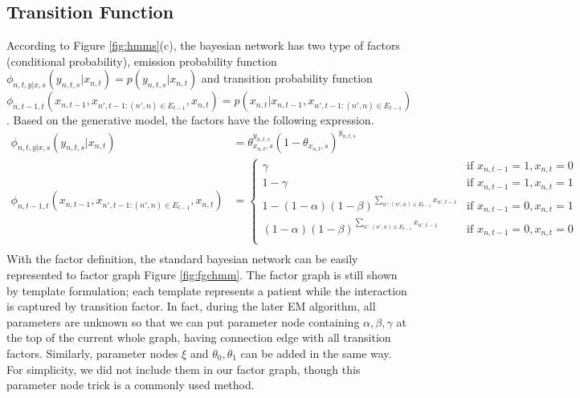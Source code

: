 \documentclass{article} %
\begin{document}
\subsection{Transition Function}
According to Figure \ref{fig:hmms}(c), the bayesian network has two type of factors (conditional probability), emission probability function $\phi_{n,t,y|x,s}(y_{n,t,s}|x_{n,t})=p(y_{n,t,s}|x_{n,t})$ and transition probability function $\phi_{n,t-1,t}(x_{n,t-1},x_{n',t-1:(n',n)\in E_{t-1}},x_{n,t})=p(x_{n,t}|x_{n,t-1},x_{n',t-1:(n',n)\in E_{t-1}})$. Based on the generative model, the factors have the following expression.
\begin{align*}
\phi_{n,t,y|x,s}(y_{n,t,s}|x_{n,t})&=\theta_{x_{n,t},s}^{y_{n,t,s}}(1-\theta_{x_{n,t},s})^{y_{n,t,s}}\\
\phi_{n,t-1,t}(x_{n,t-1},x_{n',t-1:(n',n)\in E_{t-1}},x_{n,t})&=\left\{ \begin{matrix} 
      \gamma & \text{if $x_{n,t-1}=1,x_{n,t}=0$} \\
      1-\gamma &  \text{if $x_{n,t-1}=1,x_{n,t}=1$} \\
      1-(1-\alpha)(1-\beta)^{\sum_{n':(n',n)\in E_{t-1}}x_{n',t-1}} & \text{if $x_{n,t-1}=0,x_{n,t}=1$}\\
      (1-\alpha)(1-\beta)^{\sum_{n':(n',n)\in E_{t-1}}x_{n',t-1}} & \text{if $x_{n,t-1}=0,x_{n,t}=0$}\\
   \end{matrix}\right.\\
\end{align*}
With the factor definition, the standard bayesian network can be easily represented to factor graph Figure \ref{fig:fgchmm}. The factor graph is still shown by template formulation; each template represents a patient while the interaction is captured by transition factor. In fact, during the later EM algorithm, all parameters are unknown so that we can put parameter node containing $\alpha,\beta,\gamma$ at the top of the current whole graph, having connection edge with all transition factors. Similarly, parameter nodes $\xi$ and $\theta_0,\theta_1$ can be added in the same way. For simplicity, we did not include them in our factor graph, though this parameter node trick is a commonly used method.
\end{document}
